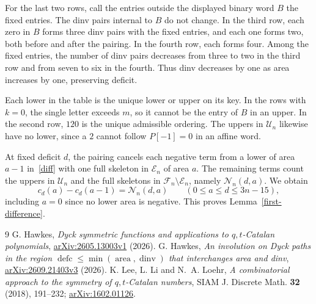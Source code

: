 \documentclass[11pt]{article}
\DeclareMathOperator{\area}{area}\DeclareMathOperator{\dinv}{dinv}
\DeclareMathOperator{\defc}{defc}\DeclareMathOperator{\sym}{sym}
\begin{document}
For the last two rows, call the entries outside the displayed binary word $B$ the fixed entries. The dinv pairs internal to $B$ do not change. In the third row, each zero in $B$ forms three dinv pairs with the fixed entries, and each one forms two, both before and after the pairing. In the fourth row, each forms four. Among the fixed entries, the number of dinv pairs decreases from three to two in the third row and from seven to six in the fourth. Thus dinv decreases by one as area increases by one, preserving deficit.

Each lower in the table is the unique lower or upper on its key. In the rows with $k=0$, the single letter exceeds $m$, so it cannot be the entry of $B$ in an upper. In the second row, $120$ is the unique admissible ordering. The uppers in $\mathcal U_n$ likewise have no lower, since a $2$ cannot follow $P[-1]=0$ in an affine word.

At fixed deficit $d$, the pairing cancels each negative term from a lower of area $a-1$ in~\eqref{diff} with one full skeleton in $\mathcal E_n$ of area $a$. The remaining terms count the uppers in $\mathcal U_n$ and the full skeletons in $\mathcal F_n\setminus\mathcal E_n$, namely $\mathcal N_n(d,a)$. We obtain
\[
 c_d(a)-c_d(a-1)=\mathcal N_n(d,a)\qquad(0\le a\le d\le3n-15),
\]
including $a=0$ since no lower area is negative. This proves Lemma~\ref{first-difference}.

\begin{thebibliography}{9}
 G. Hawkes, \emph{Dyck symmetric functions and applications to $q,t$-Catalan polynomials}, \href{https://arxiv.org/abs/2605.13003v1}{arXiv:2605.13003v1} (2026).
 G. Hawkes, \emph{An involution on Dyck paths in the region $\defc\le\min(\area,\dinv)$ that interchanges area and dinv}, \href{https://arxiv.org/abs/2609.21403v3}{arXiv:2609.21403v3} (2026).
 K. Lee, L. Li and N.~A. Loehr, \emph{A combinatorial approach to the symmetry of $q,t$-Catalan numbers}, SIAM J. Discrete Math. \textbf{32} (2018), 191--232; \href{https://arxiv.org/abs/1602.01126}{arXiv:1602.01126}.
\end{thebibliography}
\end{document}
